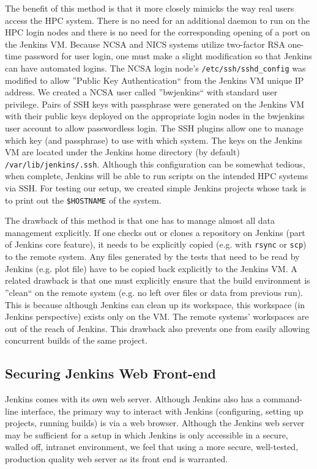 \documentclass[AMA]{WileyNJD-v1}
\begin{document}
The benefit of this method is that it more closely mimicks the way real users access the HPC system. 
There is no need for an additional daemon to run on the HPC login nodes and there is no need for the corresponding opening of a port on the Jenkins VM. 
Because NCSA and NICS systems utilize two-factor RSA one-time password for user login, one must make a slight modification so that Jenkins can have automated logins. 
The NCSA login node's \texttt{/etc/ssh/sshd_config} was modified to allow ''Public Key Authentication`` from the Jenkins VM unique IP address. 
We created a NCSA user called ''bwjenkins`` with standard user privilege. 
Pairs of SSH keys with passphrase were generated on the Jenkins VM with their public keys deployed on the appropriate login nodes in the bwjenkins user account to allow passwordless login. 
The SSH plugins allow one to manage which key (and passphrase) to use with which system. 
The keys on the Jenkins VM are located under the Jenkins home directory (by default) \texttt{/var/lib/jenkins/.ssh}. 
Although this configuration can be somewhat tedious, when complete, Jenkins will be able to run scripts on the intended HPC systems via SSH. 
For testing our setup, we created simple Jenkins projects whose task is to print out the \texttt{\$HOSTNAME} of the system.

The drawback of this method is that one has to manage almost all data management explicitly. 
If one checks out or clones a repository on Jenkins (part of Jenkins core feature), it needs to be explicitly copied (e.g. with \texttt{rsync} or \texttt{scp}) to the remote system. 
Any files generated by the tests that need to be read by Jenkins (e.g. plot file) have to be copied back explicitly to the Jenkins VM. 
A related drawback is that one must explicitly ensure that the build environment is ''clean`` on the remote system (e.g. no left over files or data from previous run). 
This is because although Jenkins can clean up its workspace, this workspace (in Jenkins perspective) exists only on the VM. 
The remote systems' workspaces are out of the reach of Jenkins. 
This drawback also prevents one from easily allowing concurrent builds of the same project. 



\subsection{Securing Jenkins Web Front-end}

Jenkins comes with its own web server. 
Although Jenkins also has a command-line interface, the primary way to interact with Jenkins (configuring, setting up projects, running builds) is via a web browser. 
Although the Jenkins web server may be sufficient for a setup in which Jenkins is only accessible in a secure, walled off, intranet environment, we feel that using a more secure, well-tested, production quality web server as its front end is warranted.
\end{document}
